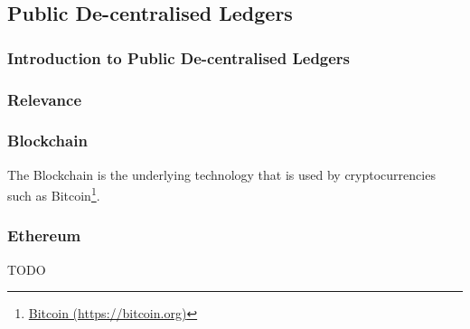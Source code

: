 \subsection{Public De-centralised Ledgers}

\subsubsection{Introduction to Public De-centralised Ledgers}

\subsubsection{Relevance}





\subsubsection{Blockchain}

The Blockchain is the underlying technology that is used by cryptocurrencies such as Bitcoin\footnote{\href{https://bitcoin.org/en/}{Bitcoin (https://bitcoin.org)}}.

\subsubsection{Ethereum}

TODO
